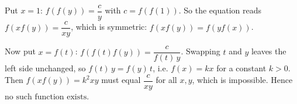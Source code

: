 Put $x=1$: $f(f(y))=\dfrac cy$ with $c=f(f(1))$. So the equation reads $f(xf(y))=\dfrac c{xy}$, which is symmetric: $f(xf(y))=f(yf(x))$.

Now put $x=f(t)$: $f(f(t)f(y))=\dfrac c{f(t)\,y}$. Swapping $t$ and $y$ leaves the left side unchanged, so $f(t)\,y=f(y)\,t$, i.e. $f(x)=kx$ for a constant $k>0$. Then $f(xf(y))=k^2xy$ must equal $\dfrac c{xy}$ for all $x,y$, which is impossible. Hence $\boxed{\text{no such function exists}}$.
